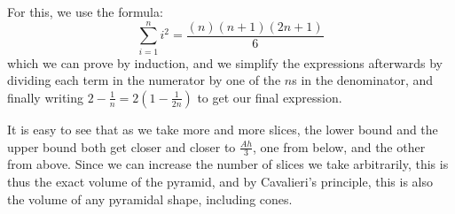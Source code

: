 \documentclass{article}
\begin{document}
For this, we use the formula:
\[ \sum_{i=1}^{n} i^2 = \frac{(n)(n+1)(2n+1)}{6} \]
which we can prove by induction, and we simplify the expressions afterwards by dividing each term
in the numerator by one of the $n$s in the denominator, and finally writing $2-\frac{1}{n} = 2(1-\frac{1}{2n})$ to get our final expression.

It is easy to see that as we take more and more slices, the lower bound and the upper bound both
get closer and closer to $\frac{Ah}{3}$, one from below, and the other from above. Since we can
increase the number of slices we take arbitrarily, this is thus the exact volume of the pyramid,
and by Cavalieri's principle, this is also the volume of any pyramidal shape, including cones.
\end{document}
